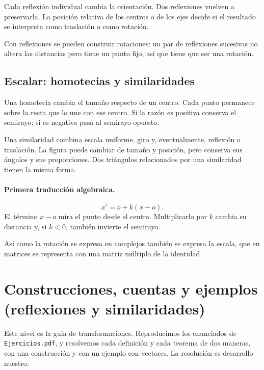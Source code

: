 \begin{idea}
Cada reflexión individual cambia la orientación. Dos reflexiones vuelven a preservarla. La
posición relativa de los centros o de los ejes decide si el resultado se interpreta como
traslación o como rotación.
\end{idea}

\begin{idea}
Con reflexiones se pueden construir rotaciones: un par de reflexiones sucesivas no altera
las distancias pero tiene un punto fijo, así que tiene que ser una rotación.
\end{idea}

\subsection{Escalar: homotecias y similaridades}\label{sec:escalar}

Una homotecia cambia el tamaño respecto de un centro. Cada punto permanece sobre la recta que
lo une con ese centro. Si la razón es positiva conserva el semirayo; si es negativa pasa al
semirayo opuesto.

Una similaridad combina escala uniforme, giro y, eventualmente, reflexión o traslación. La
figura puede cambiar de tamaño y posición, pero conserva sus ángulos y sus proporciones. Dos
triángulos relacionados por una similaridad tienen la misma forma.

\paragraph{Primera traducción algebraica.}
\[
  x'=o+k(x-o).
\]
El término \(x-o\) mira el punto desde el centro. Multiplicarlo por \(k\) cambia su distancia
y, si \(k<0\), también invierte el semirayo.

\begin{idea}
Así como la rotación se expresa en complejos también se expresa la escala, que en
matrices se representa con una matriz múltiplo de la identidad.
\end{idea}

\section{Construcciones, cuentas y ejemplos (reflexiones y similaridades)}

Este nivel es la guía de transformaciones. Reproducimos los enunciados de \texttt{Ejercicios.pdf}, y resolvemos cada definición y cada teorema de dos maneras, con una construcción y con un ejemplo con vectores. La resolución es desarrollo nuestro.

